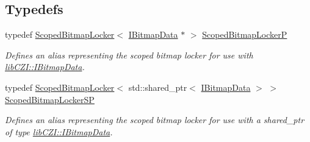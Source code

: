 \subsection*{Typedefs}
\begin{DoxyCompactItemize}
\item 
\mbox{\label{namespacelib_c_z_i_aa0a4df11f476d960267cc3757d7e889d}} 
typedef \hyperlink{classlib_c_z_i_1_1_scoped_bitmap_locker}{Scoped\+Bitmap\+Locker}$<$ \hyperlink{classlib_c_z_i_1_1_i_bitmap_data}{I\+Bitmap\+Data} $\ast$ $>$ \hyperlink{namespacelib_c_z_i_aa0a4df11f476d960267cc3757d7e889d}{Scoped\+Bitmap\+LockerP}
\begin{DoxyCompactList}\small\item\em Defines an alias representing the scoped bitmap locker for use with \hyperlink{classlib_c_z_i_1_1_i_bitmap_data}{lib\+C\+Z\+I\+::\+I\+Bitmap\+Data}. \end{DoxyCompactList}\item 
\mbox{\label{namespacelib_c_z_i_a44eca12300534095278df46d8b7ef824}} 
typedef \hyperlink{classlib_c_z_i_1_1_scoped_bitmap_locker}{Scoped\+Bitmap\+Locker}$<$ std\+::shared\+\_\+ptr$<$ \hyperlink{classlib_c_z_i_1_1_i_bitmap_data}{I\+Bitmap\+Data} $>$ $>$ \hyperlink{namespacelib_c_z_i_a44eca12300534095278df46d8b7ef824}{Scoped\+Bitmap\+Locker\+SP}
\begin{DoxyCompactList}\small\item\em Defines an alias representing the scoped bitmap locker for use with a shared\+\_\+ptr of type \hyperlink{classlib_c_z_i_1_1_i_bitmap_data}{lib\+C\+Z\+I\+::\+I\+Bitmap\+Data}. \end{DoxyCompactList}\end{DoxyCompactItemize}
